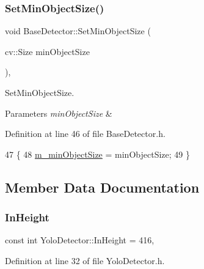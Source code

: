 \subsubsection{\texorpdfstring{Set\+Min\+Object\+Size()}{SetMinObjectSize()}}
{\footnotesize\ttfamily void Base\+Detector\+::\+Set\+Min\+Object\+Size (\begin{DoxyParamCaption}\item[{cv\+::\+Size}]{min\+Object\+Size }\end{DoxyParamCaption})\hspace{0.3cm}{\ttfamily [inline]}, {\ttfamily [inherited]}}



Set\+Min\+Object\+Size. 


\begin{DoxyParams}{Parameters}
{\em min\+Object\+Size} & \\
\hline
\end{DoxyParams}


Definition at line 46 of file Base\+Detector.\+h.


\begin{DoxyCode}
47     \{
48         \mbox{\hyperlink{class_base_detector_a651b938c89c94daac4763728637d90c9}{m\_minObjectSize}} = minObjectSize;
49     \}
\end{DoxyCode}


\subsection{Member Data Documentation}
\mbox{\label{class_yolo_detector_a8511b801a9410af0b2715d4236a4b127}} 
\subsubsection{\texorpdfstring{In\+Height}{InHeight}}
{\footnotesize\ttfamily const int Yolo\+Detector\+::\+In\+Height = 416\hspace{0.3cm}{\ttfamily [static]}, {\ttfamily [private]}}



Definition at line 32 of file Yolo\+Detector.\+h.

\mbox{\label{class_yolo_detector_a01461f7ada4da3e8027d805f7129bab4}} 
